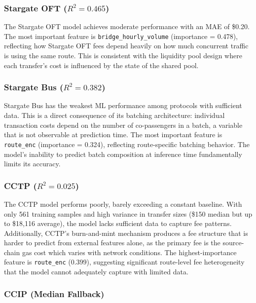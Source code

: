 \subsubsection{Stargate OFT ($R^2 = 0.465$)}

The Stargate OFT model achieves moderate performance with an MAE of \$0.20. The most important feature is \texttt{bridge\_hourly\_volume} (importance = 0.478), reflecting how Stargate OFT fees depend heavily on how much concurrent traffic is using the same route. This is consistent with the liquidity pool design where each transfer's cost is influenced by the state of the shared pool.

\subsubsection{Stargate Bus ($R^2 = 0.382$)}

Stargate Bus has the weakest ML performance among protocols with sufficient data. This is a direct consequence of its batching architecture: individual transaction costs depend on the number of co-passengers in a batch, a variable that is not observable at prediction time. The most important feature is \texttt{route\_enc} (importance = 0.324), reflecting route-specific batching behavior. The model's inability to predict batch composition at inference time fundamentally limits its accuracy.

\subsubsection{CCTP ($R^2 = 0.025$)}

The CCTP model performs poorly, barely exceeding a constant baseline. With only 561 training samples and high variance in transfer sizes (\$150 median but up to \$18{,}116 average), the model lacks sufficient data to capture fee patterns. Additionally, CCTP's burn-and-mint mechanism produces a fee structure that is harder to predict from external features alone, as the primary fee is the source-chain gas cost which varies with network conditions. The highest-importance feature is \texttt{route\_enc} (0.399), suggesting significant route-level fee heterogeneity that the model cannot adequately capture with limited data.

\subsubsection{CCIP (Median Fallback)}

